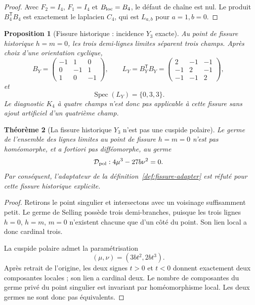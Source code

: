 \documentclass[11pt,a4paper]{article}
\newtheorem{theorem}{Théorème}[section]
\newtheorem{proposition}[theorem]{Proposition}
\begin{document}
\begin{proof}
Avec $F_2=I_4$, $F_1=I_4$ et $B_{\rm loc}=B_4$, le défaut de chaîne est nul. Le produit $B_4^{\mathsf T}B_4$ est exactement le laplacien $C_4$, qui est $L_{a,b}$ pour $a=1,b=0$.
\end{proof}

\begin{proposition}[Fissure historique : incidence $Y_3$ exacte]\label{prop:selling-Y3}
Au point de fissure historique $h=m=0$, les trois demi-lignes limites séparent trois champs. Après choix d'une orientation cyclique,
\[
B_Y=\begin{pmatrix}
-1&1&0\\
0&-1&1\\
1&0&-1
\end{pmatrix},
\qquad
L_Y=B_Y^{\mathsf T}B_Y=
\begin{pmatrix}
2&-1&-1\\
-1&2&-1\\
-1&-1&2
\end{pmatrix},
\]
et
\[
 \operatorname{Spec}(L_Y)=\{0,3,3\}.
\]
Le diagnostic $K_4$ à quatre champs n'est donc pas applicable à cette fissure sans ajout artificiel d'un quatrième champ.
\end{proposition}

\begin{theorem}[La fissure historique $Y_3$ n'est pas une cuspide polaire]\label{thm:selling-Y-not-cusp}
Le germe de l'ensemble des lignes limites au point de fissure $h=m=0$ n'est pas homéomorphe, et a fortiori pas difféomorphe, au germe
\[
 \mathcal D_{\rm pol}:4\mu^3-27b\nu^2=0.
\]
Par conséquent, l'adaptateur de la définition~\ref{def:fissure-adapter} est \emph{réfuté} pour cette fissure historique explicite.
\end{theorem}

\begin{proof}
Retirons le point singulier et intersectons avec un voisinage suffisamment petit. Le germe de Selling possède trois demi-branches, puisque les trois lignes $h=0$, $h=m$, $m=0$ n'existent chacune que d'un côté du point. Son lien local a donc cardinal trois.

La cuspide polaire admet la paramétrisation
\[
 (\mu,\nu)=(3bt^2,2bt^3).
\]
Après retrait de l'origine, les deux signes $t>0$ et $t<0$ donnent exactement deux composantes locales ; son lien a cardinal deux. Le nombre de composantes du germe privé du point singulier est invariant par homéomorphisme local. Les deux germes ne sont donc pas équivalents.
\end{proof}
\end{document}
